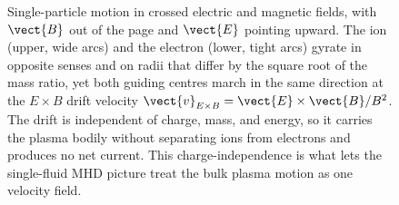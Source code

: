 \begin{figure}[htbp]
\centering
{}
\caption[Crossed-field drift]{Single-particle motion in crossed electric
and magnetic fields, with $\vect{B}$ out of the page and $\vect{E}$ pointing
upward. The ion (upper, wide arcs) and the electron (lower, tight arcs)
gyrate in opposite senses and on radii that differ by the square root of
the mass ratio, yet both guiding centres march in the same direction at the
$E\times B$ drift velocity $\vect{v}_{E\times B}=\vect{E}\times\vect{B}/B^{2}$.
The drift is independent of charge, mass, and energy, so it carries the
plasma bodily without separating ions from electrons and produces no net
current. This charge-independence is what lets the single-fluid MHD picture
treat the bulk plasma motion as one velocity field.}
\label{fig:vol04ch13:crossed-field-drift}
\end{figure}

